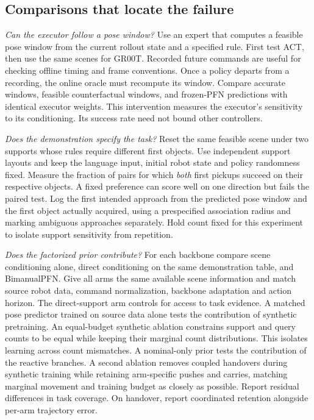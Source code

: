 \documentclass[letterpaper,10pt,conference]{ieeeconf}
\begin{document}
\subsection{Comparisons that locate the failure}
\textit{Can the executor follow a pose window?}
Use an expert that computes a feasible pose window from the current rollout state and a specified rule. First test ACT, then use the same scenes for GR00T. Recorded future commands are useful for checking offline timing and frame conventions. Once a policy departs from a recording, the online oracle must recompute its window. Compare accurate windows, feasible counterfactual windows, and frozen-PFN predictions with identical executor weights. This intervention measures the executor's sensitivity to its conditioning. Its success rate need not bound other controllers.

\textit{Does the demonstration specify the task?}
Reset the same feasible scene under two supports whose rules require different first objects. Use independent support layouts and keep the language input, initial robot state and policy randomness fixed. Measure the fraction of pairs for which \emph{both} first pickups succeed on their respective objects. A fixed preference can score well on one direction but fails the paired test. Log the first intended approach from the predicted pose window and the first object actually acquired, using a prespecified association radius and marking ambiguous approaches separately. Hold count fixed for this experiment to isolate support sensitivity from repetition.

\textit{Does the factorized prior contribute?}
For each backbone compare scene conditioning alone, direct conditioning on the same demonstration table, and BimanualPFN. Give all arms the same available scene information and match source robot data, command normalization, backbone adaptation and action horizon. The direct-support arm controls for access to task evidence. A matched pose predictor trained on source data alone tests the contribution of synthetic pretraining. An equal-budget synthetic ablation constrains support and query counts to be equal while keeping their marginal count distributions. This isolates learning across count mismatches. A nominal-only prior tests the contribution of the reactive branches. A second ablation removes coupled handovers during synthetic training while retaining arm-specific pushes and carries, matching marginal movement and training budget as closely as possible. Report residual differences in task coverage. On handover, report coordinated retention alongside per-arm trajectory error.
\end{document}
